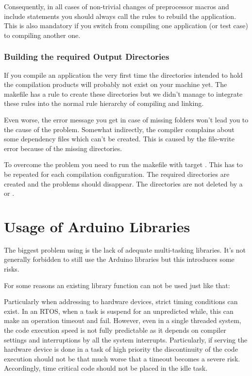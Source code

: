 Consequently, in all cases of non-trivial changes of preprocessor macros
and include statements you should always call the rules to rebuild the
application. This is also mandatory if you switch from compiling one
\rtos{} application (or test case) to compiling another one.


\subsubsection{Building the required Output Directories}

If you compile an \rtos{} application the very first time the directories
intended to hold the compilation products will probably not exist on your
machine yet. The makefile has a rule to create these directories but we
didn't manage to integrate these rules into the normal rule hierarchy of
compiling and linking.

Even worse, the error message you get in case of missing folders won't
lead you to the cause of the problem. Somewhat indirectly, the compiler
complains about some dependency files which can't be created. This is
caused by the file-write error because of the missing directories.

To overcome the problem you need to run the makefile with target
. This has to be repeated for each compilation
configuration. The required directories are created and the problems
should disappear. The directories are not deleted by a  or
.


\section{Usage of Arduino Libraries}

The biggest problem using \rtos{} is the lack of adequate multi-tasking
libraries. It's not generally forbidden to still use the Arduino libraries
but this introduces some risks. 

For some reasons an existing library function can not be used just like
that:

Particularly when addressing to hardware devices, strict timing conditions
can exist. In an RTOS, when a task is suspend for an unpredicted while,
this can make an operation timeout and fail. However, even in a single
threaded system, the code execution speed is not fully predictable as it
depends on compiler settings and interruptions by all the system
interrupts. Particularly, if serving the hardware device is done in a task
of high priority the discontinuity of the code execution should not be
that much worse that a timeout becomes a severe risk. Accordingly, time
critical code should not be placed in the idle task.

